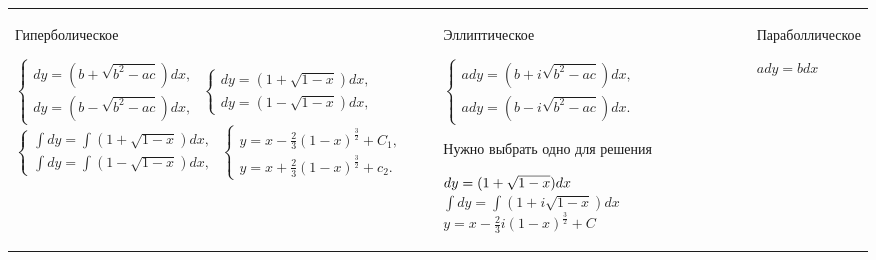 \documentclass[a4paper, 12pt]{extarticle}
\begin{document}
\begin{enumerate}[leftmargin=*]
    \begin{tabularx}{\textwidth} { 
         >{\centering}X 
         >{\centering}X 
         >{\centering}X  }
            \begin{tcolorbox}[height=1cm]
                Гиперболическое
            \end{tcolorbox}      
            \begin{tcolorbox}
            $\begin{cases}
            dy=(b+\sqrt{b^2-ac})dx,\\
            dy=(b-\sqrt{b^2-ac})dx,
            \end{cases}$
            $\begin{cases}
                dy=(1+\sqrt{1-x})dx,\\
                dy=(1-\sqrt{1-x})dx,
            \end{cases}$
            $\begin{cases}
                \int dy=\int(1+\sqrt{1-x})dx,\\
                \int dy=\int(1-\sqrt{1-x})dx,
            \end{cases}$
            $\begin{cases}
                y=x-\frac{2}{3}(1-x)^{\frac{3}{2}}+C_1,\\
                y=x+\frac{2}{3}(1-x)^{\frac{3}{2}}+c_2.
            \end{cases}$
            \end{tcolorbox}
            &
            \begin{tcolorbox}[height=1cm]
                Эллиптическое
            \end{tcolorbox}

            \begin{tcolorbox}
                $\begin{cases}
                ady=(b+i\sqrt{b^2-ac})dx,\\
                ady=(b-i\sqrt{b^2-ac})dx.
            \end{cases}$

            \vspace*{2mm}
                Нужно выбрать одно для решения
            
            $dy=(1+\sqrt{1-x})dx\\$
            $\int dy=\int(1+i\sqrt{1-x})dx$
            $y=x-\frac{2}{3}i(1-x)^{\frac{3}{2}}+C$

            \end{tcolorbox}
            &
           \begin{tcolorbox}[height=1cm]
            Параболлическое 
            \end{tcolorbox}
            \begin{tcolorbox}
                $ady=bdx$


\end{tcolorbox}
\end{tabularx}
\end{enumerate}
\end{document}
